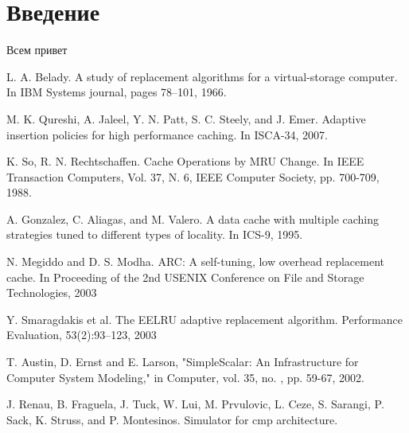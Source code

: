 \documentclass[a4paper,12pt,oneside]{scrartcl}
\begin{document}

\cleardoublepage


\tableofcontents
\listoffigures
\listoftables

\cleardoublepage


\section{Введение}\label{sec:intro}

Всем привет


\cleardoublepage
\begin{thebibliography}{99}
 L. A. Belady. A study of replacement algorithms for a virtual-storage computer. In IBM Systems journal, pages 78–101, 1966.

 M. K. Qureshi, A. Jaleel, Y. N. Patt, S. C. Steely, and J. Emer. Adaptive insertion policies for high performance caching. In ISCA-34, 2007.

 K. So, R. N. Rechtschaffen.  Cache   Operations   by   MRU   Change. In IEEE Transaction Computers, Vol. 37, N. 6, IEEE Computer Society, pp. 700-709, 1988. 

  A. Gonzalez, C. Aliagas, and M. Valero. A data cache with multiple caching strategies tuned to different types of locality. In ICS-9, 1995.

 N. Megiddo and D. S. Modha. ARC: A self-tuning, low overhead replacement cache. In Proceeding of the 2nd USENIX Conference on File and Storage Technologies, 2003

 Y. Smaragdakis et al. The EELRU adaptive replacement algorithm. Performance Evaluation, 53(2):93–123, 2003

 T. Austin, D. Ernst and E. Larson, "SimpleScalar: An Infrastructure for Computer System Modeling," in Computer, vol. 35, no. , pp. 59-67, 2002. 

 J. Renau, B. Fraguela, J. Tuck, W. Lui, M. Prvulovic, L. Ceze, S. Sarangi, P. Sack, K. Struss, and P. Montesinos. Simulator for cmp architecture.

\end{thebibliography}

\cleardoublepage
\end{document}
